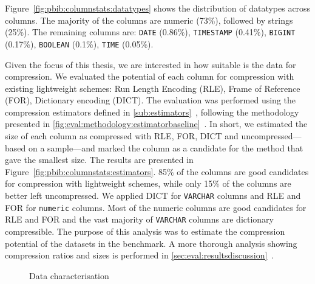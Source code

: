 Figure~\ref{fig:pbib:columnstats:datatypes} shows the distribution of datatypes across columns. The majority of the columns are numeric (73\%), followed by strings (25\%). The remaining columns are: \verb|DATE| (0.86\%), \verb|TIMESTAMP| (0.41\%), \verb|BIGINT| (0.17\%), \verb|BOOLEAN| (0.1\%), \verb|TIME| (0.05\%).

Given the focus of this thesis, we are interested in how suitable is the data for compression. We evaluated the potential of each column for compression with existing lightweight schemes: Run Length Encoding (RLE), Frame of Reference (FOR), Dictionary encoding (DICT). The evaluation was performed using the compression estimators defined in \ref{sub:estimators}~, following the methodology presented in \ref{fig:eval:methodology:estimatorbaseline}~. In short, we estimated the size of each column as compressed with RLE, FOR, DICT and uncompressed---based on a sample---and marked the column as a candidate for the method that gave the smallest size. The results are presented in Figure~\ref{fig:pbib:columnstats:estimators}. 85\% of the columns are good candidates for compression with lightweight schemes, while only 15\% of the columns are better left uncompressed. We applied DICT for \verb|VARCHAR| columns and RLE and FOR for \verb|numeric| columns. Most of the numeric columns are good candidates for RLE and FOR and the vast majority of \verb|VARCHAR| columns are dictionary compressible. The purpose of this analysis was to estimate the compression potential of the datasets in the benchmark. A more thorough analysis showing compression ratios and sizes is performed in \ref{sec:eval:resultsdiscussion}~.

\begin{figure}[h]
\centering
{}
\caption{Data characterisation}
\label{fig:pbib:datastats}
\end{figure}

